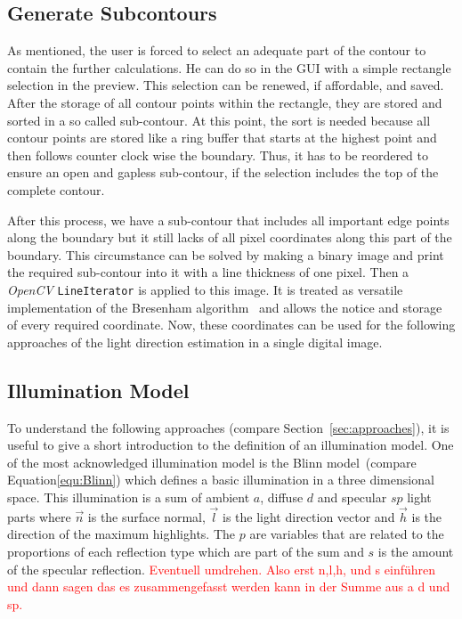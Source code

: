 \subsection{Generate Subcontours}\label{sec:subcontours}
As mentioned, the user is forced to select an adequate part of the contour to contain the further calculations. He can do so in the GUI with a simple rectangle selection in the preview. This selection can be renewed, if affordable, and saved. After the storage of all contour points within the rectangle, they are stored and sorted in a so called  sub-contour. At this point, the sort is needed because all contour points are stored like a ring buffer that starts at the highest point and then follows counter clock wise the boundary. Thus, it has to be reordered to ensure an open and gapless sub-contour, if the selection includes the top of the complete contour.

After this process, we have a sub-contour that includes all important edge points along the boundary but it still lacks of all pixel coordinates along this part of the boundary.
This circumstance can be solved by making a binary image and print the required sub-contour into it with a line thickness of one pixel. Then a \textit{OpenCV} \texttt{LineIterator} is applied to this image. It is treated as versatile implementation of the Bresenham algorithm~\cite{5388473} and allows the notice and storage of every required coordinate. Now, these coordinates can be used for the following approaches of the light direction estimation in a single digital image.


\subsection{Illumination Model}\label{sec:lightingmodel}
To understand the following approaches (compare Section~\ref{sec:approaches}), it is useful to give a short introduction to the definition of an illumination model. One of the most acknowledged illumination model is the Blinn model~\cite{Blinn:1977}(compare Equation\ref{equ:Blinn}) which defines a basic illumination in a three dimensional space. This illumination is a sum of ambient $a$, diffuse $d$ and specular $sp$ light parts where $\vec{n}$ is the surface normal, $\vec{l}$ is the light direction vector and $\vec{h}$ is the direction of the maximum highlights. The $p$ are variables that are related to the proportions of each reflection type which are part of the sum and $s$ is the amount of the specular reflection. \textcolor{red}{Eventuell umdrehen. Also erst n,l,h, und s einführen und dann sagen das es zusammengefasst werden kann in der Summe aus a d und sp.}

